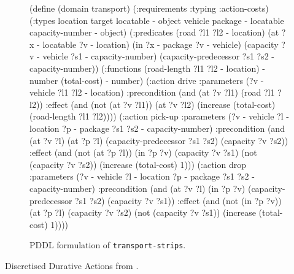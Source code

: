 \begin{figure}[tbp]
\begin{code}
(define (domain transport)
  (:requirements :typing :action-costs)
  (:types
        location target locatable - object
        vehicle package - locatable
        capacity-number - object)
  (:predicates 
     (road ?l1 ?l2 - location)
     (at ?x - locatable ?v - location)
     (in ?x - package ?v - vehicle)
     (capacity ?v - vehicle ?s1 - capacity-number)
     (capacity-predecessor ?s1 ?s2 - capacity-number))
  (:functions
     (road-length ?l1 ?l2 - location) - number
     (total-cost) - number)     
  (:action drive
    :parameters (?v - vehicle ?l1 ?l2 - location)
    :precondition (and (at ?v ?l1) (road ?l1 ?l2))
    :effect (and (not (at ?v ?l1)) (at ?v ?l2)
        (increase (total-cost) (road-length ?l1 ?l2))))        
 (:action pick-up
    :parameters (?v - vehicle ?l - location ?p - package
                 ?s1 ?s2 - capacity-number)
    :precondition (and (at ?v ?l) (at ?p ?l)
        (capacity-predecessor ?s1 ?s2) (capacity ?v ?s2))
    :effect (and (not (at ?p ?l)) (in ?p ?v) (capacity ?v ?s1)
        (not (capacity ?v ?s2)) (increase (total-cost) 1)))
  (:action drop
    :parameters (?v - vehicle ?l - location ?p - package
                 ?s1 ?s2 - capacity-number)
    :precondition (and (at ?v ?l) (in ?p ?v)
        (capacity-predecessor ?s1 ?s2) (capacity ?v ?s1))
    :effect (and (not (in ?p ?v)) (at ?p ?l) (capacity ?v ?s2)
        (not (capacity ?v ?s1)) (increase (total-cost) 1))))
\end{code}
\caption{PDDL formulation of \texttt{transport-strips}.}
\label{code:pddl-strips}
\end{figure} %


Discretised Durative Actions from \citep[Section~5]{Fox2003}.

